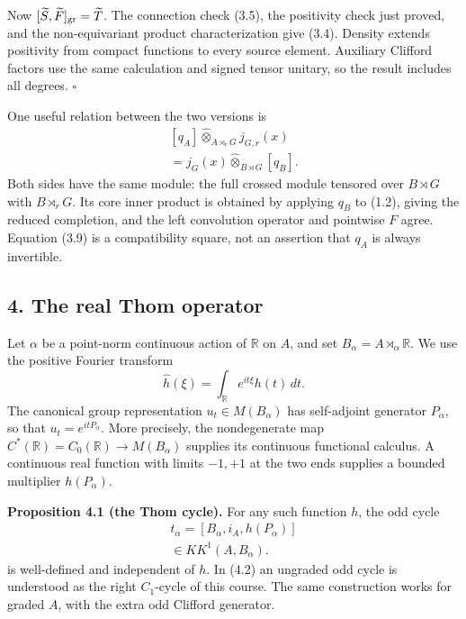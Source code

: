 \documentclass[
  11pt,
]{article}
\begin{document}
Now \([\widetilde S,\widetilde F]_{\rm gr}=\widetilde T\). The
connection check (3.5), the positivity check just proved, and the
non-equivariant product characterization give (3.4). Density extends
positivity from compact functions to every source element. Auxiliary
Clifford factors use the same calculation and signed tensor unitary, so
the result includes all degrees. \(\square\)

One useful relation between the two versions is \[
\begin{gathered}
{}[q_A]\widehat\otimes_{A\rtimes_rG}j_{G,r}(x)\\
 =j_G(x)\widehat\otimes_{B\rtimes G}[q_B].
\end{gathered}
\tag{3.9}
\] Both sides have the same module: the full crossed module tensored
over \(B\rtimes G\) with \(B\rtimes_rG\). Its core inner product is
obtained by applying \(q_B\) to (1.2), giving the reduced completion,
and the left convolution operator and pointwise \(F\) agree. Equation
(3.9) is a compatibility square, not an assertion that \(q_A\) is always
invertible.

\subsection{4. The real Thom operator}\label{the-real-thom-operator}

Let \(\alpha\) be a point-norm continuous action of \(\mathbb R\) on
\(A\), and set \(B_\alpha=A\rtimes_\alpha\mathbb R\). We use the
positive Fourier transform \[
\widehat h(\xi)=\int_{\mathbb R}e^{it\xi}h(t)\,dt.
\tag{4.1}
\] The canonical group representation \(u_t\in M(B_\alpha)\) has
self-adjoint generator \(P_\alpha\), so that \(u_t=e^{itP_\alpha}\).
More precisely, the nondegenerate map
\(C^*(\mathbb R)=C_0(\mathbb R)\to M(B_\alpha)\) supplies its continuous
functional calculus. A continuous real function with limits \(-1,+1\) at
the two ends supplies a bounded multiplier \(h(P_\alpha)\).

\textbf{Proposition 4.1 (the Thom cycle).} For any such function \(h\),
the odd cycle \[
\begin{gathered}
t_\alpha=[B_\alpha,i_A,h(P_\alpha)]\\
 \in KK^1(A,B_\alpha).
\end{gathered}
\tag{4.2}
\] is well-defined and independent of \(h\). In (4.2) an ungraded odd
cycle is understood as the right \(C_1\)-cycle of this course. The same
construction works for graded \(A\), with the extra odd Clifford
generator.
\end{document}
